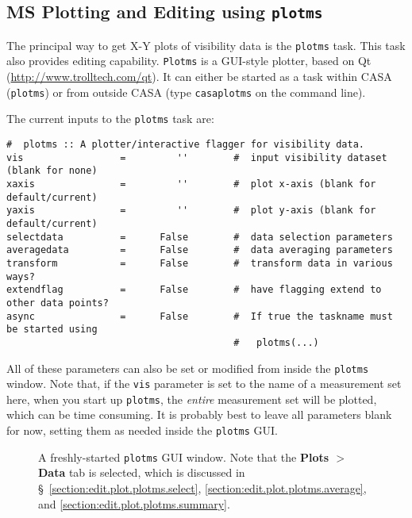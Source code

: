 \subsection{MS Plotting and Editing using {\tt plotms}}
\label{section:edit.plot.plotms}

The principal way to get X-Y plots of visibility data is the {\tt plotms} task. This task also provides editing capability. {\tt Plotms} is a GUI-style plotter, based on Qt (\url{http://www.trolltech.com/qt}). It can either be started as a task within CASA ({\tt plotms}) or from outside CASA (type {\tt casaplotms} on the command line).

The current inputs to the {\tt plotms} task are:
\small
\begin{verbatim}
#  plotms :: A plotter/interactive flagger for visibility data.
vis                 =         ''        #  input visibility dataset (blank for none)
xaxis               =         ''        #  plot x-axis (blank for default/current)
yaxis               =         ''        #  plot y-axis (blank for default/current)
selectdata          =      False        #  data selection parameters
averagedata         =      False        #  data averaging parameters
transform           =      False        #  transform data in various ways?
extendflag          =      False        #  have flagging extend to other data points?
async               =      False        #  If true the taskname must be started using
                                        #   plotms(...)
\end{verbatim}
\normalsize
All of these parameters can also be set or modified from inside the {\tt plotms} window. Note that, if the {\tt vis} parameter is set to the name of a measurement set here, when you start up {\tt plotms}, the {\it entire} measurement set will be plotted, which can be time consuming. It is probably best to leave all parameters blank for now, setting them as needed inside the {\tt plotms} GUI.

\begin{figure}[h!]
\begin{center}
\caption{\label{fig:plotms_empty} A freshly-started {\tt plotms} GUI window. Note that the {\bf Plots $>$ Data} tab is selected, which is discussed in \S~\ref{section:edit.plot.plotms.select}, \ref{section:edit.plot.plotms.average}, and \ref{section:edit.plot.plotms.summary}.} 
\hrulefill
\end{center}
\end{figure}

